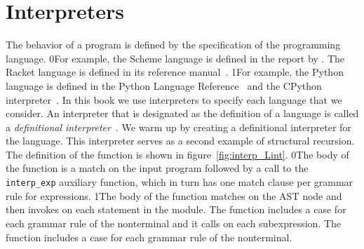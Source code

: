 \documentclass[7x10]{TimesAPriori_MIT}%
\def\racketEd{0}
\def\pythonEd{1}
\def\edition{1}
\newcommand{\racket}[1]{{\if\edition\racketEd{#1}\fi}}
\newcommand{\pythonColor}[0]{}
\newcommand{\python}[1]{{\if\edition\pythonEd\pythonColor #1\fi}}
\numberwithin{theorem}{chapter}
\numberwithin{definition}{chapter}
\numberwithin{equation}{chapter}
\begin{document}
\section{Interpreters}
\label{sec:interp_Lint}

The behavior of a program is defined by the specification of the
programming language.
%
\racket{For example, the Scheme language is defined in the report by
  \citet{SPERBER:2009aa}. The Racket language is defined in its
  reference manual~\citep{plt-tr}.}
%
\python{For example, the Python language is defined in the Python
  Language Reference~\citep{PSF21:python_ref} and the CPython interpreter~\citep{PSF21:cpython}.}
%
In this book we use interpreters to specify each language that we
consider. An interpreter that is designated as the definition of a
language is called a \emph{definitional
  interpreter}~\citep{reynolds72:_def_interp}.
 We warm up by creating a
definitional interpreter for the \LangInt{} language. This interpreter
serves as a second example of structural recursion. The definition of the
 function is shown in
figure~\ref{fig:interp_Lint}.
%
\racket{The body of the function is a match on the input program
  followed by a call to the \lstinline{interp_exp} auxiliary function,
  which in turn has one match clause per grammar rule for \LangInt{}
  expressions.}
%
\python{The body of the function matches on the  AST node
  and then invokes \code{interp\_stmt} on each statement in the
  module.  The \code{interp\_stmt} function includes a case for each
  grammar rule of the \Stmt{} nonterminal and it calls
  \code{interp\_exp} on each subexpression.  The \code{interp\_exp}
  function includes a case for each grammar rule of the \Exp{}
  nonterminal.}
\end{document}
